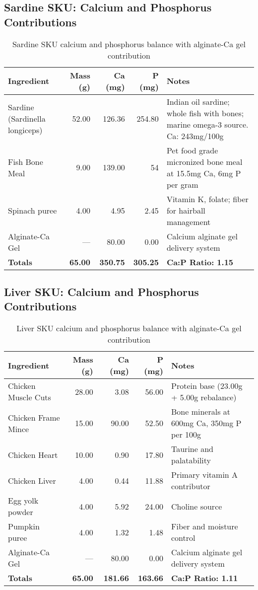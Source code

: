 \subsection*{Sardine SKU: Calcium and Phosphorus Contributions}  
\begin{table}[htbp]  
\centering  
\begin{tabular}{@{}l r r r p{7.0cm}@{}}  
\toprule  
Ingredient & Mass (g) & Ca (mg) & P (mg) & Notes \\  
\midrule  
Sardine (Sardinella longiceps) & 52.00 & 126.36 & 254.80 & Indian oil sardine; whole fish with bones; marine omega-3 source. Ca: 243mg/100g \cite{fishbase_longiceps} \\  
Fish Bone Meal & 9.00 & 139.00 & 54 & Pet food grade micronized bone meal at 15.5mg Ca, 6mg P per gram \cite{fbm_poultry} \\
Spinach puree & 4.00 & 4.95 & 2.45 & Vitamin K, folate; fiber for hairball management \\
Alginate-Ca Gel & --- & 80.00 & 0.00 & Calcium alginate gel delivery system \\
\midrule
\textbf{Totals} & \textbf{65.00} & \textbf{350.75} & \textbf{305.25} & \textbf{Ca:P Ratio: 1.15} \\
\bottomrule  
\end{tabular}  
\caption*{Sardine SKU calcium and phosphorus balance with alginate-Ca gel contribution}  
\end{table}

\vspace{1em}  

\subsection*{Liver SKU: Calcium and Phosphorus Contributions}  
\begin{table}[htbp]  
\centering  
\begin{tabular}{@{}l r r r p{7.0cm}@{}}  
\toprule  
Ingredient & Mass (g) & Ca (mg) & P (mg) & Notes \\  
\midrule  
Chicken Muscle Cuts & 28.00 & 3.08 & 56.00 & Protein base (23.00g + 5.00g rebalance) \\
Chicken Frame Mince & 15.00 & 90.00 & 52.50 & Bone minerals at 600mg Ca, 350mg P per 100g \cite{gopalakrishnan2019bonecomposition,usdaFDCbone2021}\\
Chicken Heart & 10.00 & 0.90 & 17.80 & Taurine and palatability \\
Chicken Liver & 4.00 & 0.44 & 11.88 & Primary vitamin A contributor \\
Egg yolk powder & 4.00 & 5.92 & 24.00 & Choline source \\
Pumpkin puree & 4.00 & 1.32 & 1.48 & Fiber and moisture control \\
Alginate-Ca Gel & --- & 80.00 & 0.00 & Calcium alginate gel delivery system \\
\midrule
\textbf{Totals} & \textbf{65.00} & \textbf{181.66} & \textbf{163.66} & \textbf{Ca:P Ratio: 1.11} \\
\bottomrule  
\end{tabular}  
\caption*{Liver SKU calcium and phosphorus balance with alginate-Ca gel contribution}  
\end{table}  

